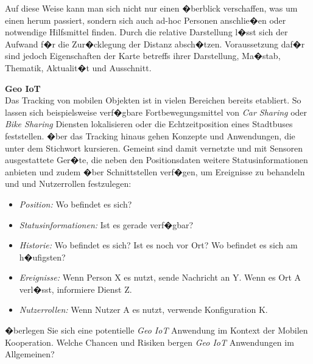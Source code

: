 
Auf diese Weise kann man sich nicht nur einen �berblick verschaffen, was um einen herum passiert, sondern sich auch ad-hoc Personen anschlie�en oder notwendige Hilfsmittel finden. Durch die relative Darstellung l�sst sich der Aufwand f�r die Zur�cklegung der Distanz absch�tzen.  Voraussetzung daf�r sind jedoch Eigenschaften der Karte betreffs ihrer Darstellung, Ma�stab, Thematik, Aktualit�t und Ausschnitt. %


\begin{discussion}
\textbf{Geo IoT}\\
Das Tracking von mobilen Objekten ist in vielen Bereichen bereits etabliert. So lassen sich beispielsweise verf�gbare Fortbewegungsmittel von \textit{Car Sharing} oder \textit{Bike Sharing} Diensten lokalisieren oder die Echtzeitposition eines Stadtbuses feststellen. �ber das Tracking hinaus gehen Konzepte und Anwendungen, die unter dem Stichwort  kursieren. Gemeint sind damit vernetzte und mit Sensoren ausgestattete Ger�te, die neben den Positionsdaten weitere Statusinformationen anbieten und zudem �ber Schnittstellen verf�gen, um Ereignisse zu behandeln und und Nutzerrollen festzulegen:

\begin{itemize}
\item \textit{Position:} Wo befindet es sich?
\item \textit{Statusinformationen:} Ist es gerade verf�gbar? 
\item \textit{Historie:} Wo befindet es sich? Ist es noch vor Ort? Wo befindet es sich am h�ufigsten?
\item \textit{Ereignisse:} Wenn Person X es nutzt, sende Nachricht an Y. Wenn es Ort A verl�sst, informiere Dienst Z.
\item \textit{Nutzerrollen:} Wenn Nutzer A es nutzt, verwende Konfiguration K.
\end{itemize}

�berlegen Sie sich eine potentielle \textit{Geo IoT} Anwendung im Kontext der Mobilen Kooperation. Welche Chancen und Risiken bergen \textit{Geo IoT} Anwendungen im Allgemeinen? 

\end{discussion}


